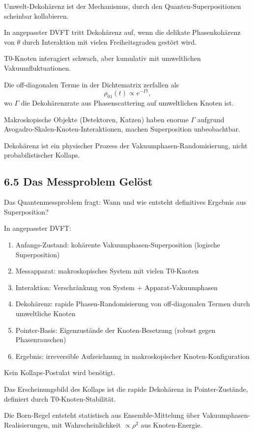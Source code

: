 	Umwelt-Dekohärenz ist der Mechanismus, durch den Quanten-Superpositionen scheinbar kollabieren.
	
	In angepasster DVFT tritt Dekohärenz auf, wenn die delikate Phasenkohärenz von $\theta$ durch Interaktion mit vielen Freiheitsgraden gestört wird.
	
	T0-Knoten interagiert schwach, aber kumulativ mit umweltlichen Vakuumfluktuationen.
	
	Die off-diagonalen Terme in der Dichtematrix zerfallen als
	\[
	\rho_{01}(t) \propto e^{-\Gamma t},
	\]
	wo $\Gamma$ die Dekohärenzrate aus Phasenscattering auf umweltlichen Knoten ist.
	
	Makroskopische Objekte (Detektoren, Katzen) haben enorme $\Gamma$ aufgrund Avogadro-Skalen-Knoten-Interaktionen, machen Superposition unbeobachtbar.
	
	Dekohärenz ist ein physischer Prozess der Vakuumphasen-Randomisierung, nicht probabilistischer Kollaps.
	
	\subsection{6.5 Das Messproblem Gelöst}
	
	Das Quantenmessproblem fragt: Wann und wie entsteht definitives Ergebnis aus Superposition?
	
	In angepasster DVFT:
	\begin{enumerate}
		\item Anfangs-Zustand: kohärente Vakuumphasen-Superposition (logische Superposition)
		\item Messapparat: makroskopisches System mit vielen T0-Knoten
		\item Interaktion: Verschränkung von System + Apparat-Vakuumphasen
		\item Dekohärenz: rapide Phasen-Randomisierung von off-diagonalen Termen durch umweltliche Knoten
		\item Pointer-Basis: Eigenzustände der Knoten-Besetzung (robust gegen Phasenrauschen)
		\item Ergebnis: irreversible Aufzeichnung in makroskopischer Knoten-Konfiguration
	\end{enumerate}
	
	Kein Kollaps-Postulat wird benötigt.
	
	Das Erscheinungsbild des Kollaps ist die rapide Dekohärenz in Pointer-Zustände, definiert durch T0-Knoten-Stabilität.
	
	Die Born-Regel entsteht statistisch aus Ensemble-Mittelung über Vakuumphasen-Realisierungen, mit Wahrscheinlichkeit $\propto \rho^2$ aus Knoten-Energie.
	

